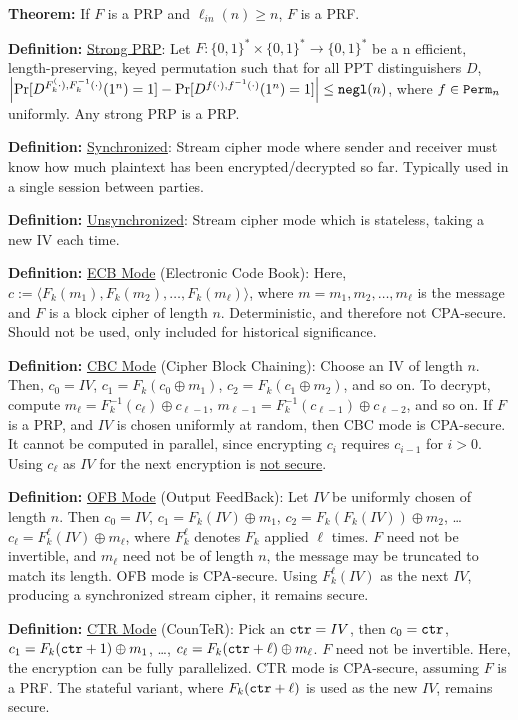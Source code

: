 \documentclass[12pt]{article}
\newcommand{\defn}[1]{{\bf Definition:} \underline{#1}}
\newcommand{\thm}[1]{{\bf Theorem:} \underline{#1}}
\newcommand{\ang}[1]{\langle#1\rangle}
\newcommand{\xor}{\oplus}
\newcommand{\negl}{{\tt negl}}
\newcommand{\ctr}{{\tt ctr}}
\begin{document}
\begin{multicols}{3}
\thm{} If $F$ is a PRP and $\ell_{in}(n)\geq n$, $F$ is a PRF.

\defn{Strong PRP}: Let $F:\{0,1\}^*\times\{0,1\}^*\to\{0,1\}^*$ be a n efficient, length-preserving, keyed permutation such that for all PPT distinguishers $D$, $\left|\Pr[D^{F_k^(\cdot),F_k^{-1}(\cdot)}(1^n)=1]-\Pr[D^{f(\cdot),f^{-1}(\cdot)}(1^n)=1]\right|\leq\negl(n)$, where $f\in{\tt Perm}_n$ uniformly. Any strong PRP is a PRP.

\defn{Synchronized}: Stream cipher mode where sender and receiver must know how much plaintext has been encrypted/decrypted so far. Typically used in a single session between parties.

\defn{Unsynchronized}: Stream cipher mode which is stateless, taking a new IV each time.

\defn{ECB Mode} (Electronic Code Book): Here, $c:=\ang{F_k(m_1),F_k(m_2),\dots,F_k(m_\ell)}$, where $m=m_1,m_2,\dots,m_\ell$ is the message and $F$ is a block cipher of length $n$. Deterministic, and therefore not CPA-secure. Should not be used, only included for historical significance.

\defn{CBC Mode} (Cipher Block Chaining): Choose an IV of length $n$. Then, $c_0=IV$, $c_1=F_k(c_0\xor m_1)$, $c_2=F_k(c_1\xor m_2)$, and so on. To decrypt, compute $m_\ell=F^{-1}_k(c_\ell)\xor c_{\ell-1}$, $m_{\ell-1}=F_k^{-1}(c_{\ell-1})\xor c_{\ell-2}$, and so on. If $F$ is a PRP, and $IV$ is chosen uniformly at random, then CBC mode is CPA-secure. It cannot be computed in parallel, since encrypting $c_i$ requires $c_{i-1}$ for $i>0$. Using $c_\ell$ as $IV$ for the next encryption is \underline{not secure}.

\defn{OFB Mode} (Output FeedBack): Let $IV$ be uniformly chosen of length $n$. Then $c_0=IV$, $c_1=F_k(IV)\xor m_1$, $c_2=F_k(F_k(IV))\xor m_2$, \dots $c_\ell=F_k^\ell(IV)\xor m_\ell$, where $F_k^\ell$ denotes $F_k$ applied $\ell$ times. $F$ need not be invertible, and $m_\ell$ need not be of length $n$, the message may be truncated to match its length. OFB mode is CPA-secure. Using $F_k^{\ell}(IV)$ as the next $IV$, producing a synchronized stream cipher, it remains secure.

\defn{CTR Mode} (CounTeR): Pick an $\ctr=IV$, then $c_0=\ctr$, $c_1=F_k(\ctr+1)\xor m_1$, \dots, $c_\ell=F_k(\ctr+\ell)\xor m_\ell$. $F$ need not be invertible. Here, the encryption can be fully parallelized. CTR mode is CPA-secure, assuming $F$ is a PRF. The stateful variant, where $F_k(\ctr+\ell)$ is used as the new $IV$, remains secure.


\end{multicols}
\end{document}
